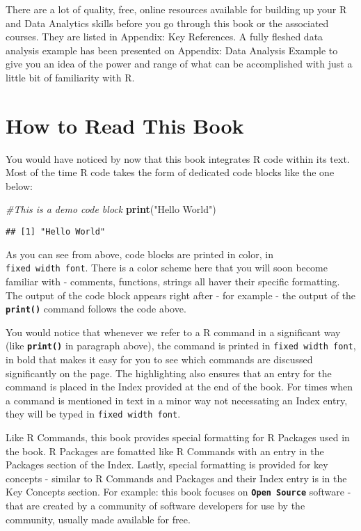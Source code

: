\documentclass[
]{krantz}
\makeatletter
\newenvironment{Shaded}{\begin{snugshade}}{\end{snugshade}}
\newcommand{\CommentTok}[1]{\textcolor[rgb]{0.37,0.37,0.37}{\textit{#1}}}
\newcommand{\KeywordTok}[1]{\textcolor[rgb]{0.27,0.27,0.27}{\textbf{#1}}}
\newcommand{\NormalTok}[1]{#1}
\newcommand{\StringTok}[1]{\textcolor[rgb]{0.5,0.5,0.5}{#1}}
\newenvironment{kframe}{%
\medskip{}
\setlength{\fboxsep}{.8em}
 \def\at@end@of@kframe{}%
 \ifinner\ifhmode%
  \def\at@end@of@kframe{\end{minipage}}%
  \begin{minipage}{\columnwidth}%
 \fi\fi%
 \def\FrameCommand##1{\hskip\@totalleftmargin \hskip-\fboxsep
 \colorbox{shadecolor}{##1}\hskip-\fboxsep
     \hskip-\linewidth \hskip-\@totalleftmargin \hskip\columnwidth}%
 \MakeFramed {\advance\hsize-\width
   \@totalleftmargin\z@ \linewidth\hsize
   \@setminipage}}%
 {\par\unskip\endMakeFramed%
 \at@end@of@kframe}
\renewenvironment{Shaded}{\begin{kframe}}{\end{kframe}}
\makeatother
\begin{document}
There are a lot of quality, free, online resources available for building up your R and Data Analytics skills before you go through this book or the associated courses. They are listed in Appendix: Key References. A fully fleshed data analysis example has been presented on Appendix: Data Analysis Example to give you an idea of the power and range of what can be accomplished with just a little bit of familiarity with R.

\hypertarget{how-to-read-this-book}{%
\section*{How to Read This Book}\label{how-to-read-this-book}}


You would have noticed by now that this book integrates R code within its text. Most of the time R code takes the form of dedicated code blocks like the one below:

\begin{Shaded}
\begin{Highlighting}[]
\CommentTok{#This is a demo code block}
\KeywordTok{print}\NormalTok{(}\StringTok{"Hello World"}\NormalTok{)}
\end{Highlighting}
\end{Shaded}

\begin{verbatim}
## [1] "Hello World"
\end{verbatim}

As you can see from above, code blocks are printed in color, in \texttt{fixed\ width\ font}. There is a color scheme here that you will soon become familiar with - comments, functions, strings all haver their specific formatting. The output of the code block appears right after - for example - the output of the \textbf{\texttt{print()}} command follows the code above.

You would notice that whenever we refer to a R command in a significant way (like \textbf{\texttt{print()}} in paragraph above), the command is printed in \texttt{fixed\ width\ font}, in bold that makes it easy for you to see which commands are discussed significantly on the page. The highlighting also ensures that an entry for the command is placed in the Index provided at the end of the book. For times when a command is mentioned in text in a minor way not necessating an Index entry, they will be typed in \texttt{fixed\ width\ font}.

Like R Commands, this book provides special formatting for R Packages used in the book. R Packages are fomatted like R Commands with an entry in the Packages section of the Index. Lastly, special formatting is provided for key concepts - similar to R Commands and Packages and their Index entry is in the Key Concepts section. For example: this book focuses on \textbf{\texttt{Open\ Source}} software - that are created by a community of software developers for use by the community, usually made available for free.
\end{document}
